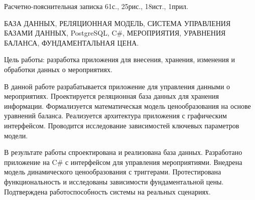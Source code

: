 
Расчетно-пояснительная записка 61с., 25рис., 18ист., 1прил.

БАЗА ДАННЫХ, РЕЛЯЦИОННАЯ МОДЕЛЬ, СИСТЕМА УПРАВЛЕНИЯ БАЗАМИ ДАННЫХ, PostgreSQL, C\#, МЕРОПРИЯТИЯ, УРАВНЕНИЯ БАЛАНСА, ФУНДАМЕНТАЛЬНАЯ ЦЕНА.

Цель работы: разработка приложения для внесения, хранения, изменения и обработки данных о мероприятиях.

В данной работе разрабатывается приложение для управления данными о мероприятиях. Проектируется реляционная база данных для хранения информации. Формализуется математическая модель ценообразования на основе уравнений баланса. Реализуется архитектура приложения с графическим интерфейсом. Проводится исследование зависимостей ключевых параметров модели.

В результате работы спроектирована и реализована база данных. Разработано приложение на C\# с интерфейсом для управления мероприятиями. Внедрена модель динамического ценообразования с триггерами. Протестирована функциональность и исследованы зависимости фундаментальной цены. Подтверждена работоспособность системы на реальных сценариях.